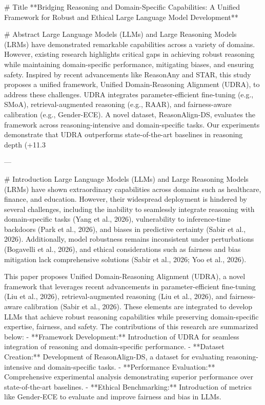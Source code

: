 # Title  
**Bridging Reasoning and Domain-Specific Capabilities: A Unified Framework for Robust and Ethical Large Language Model Development**

# Abstract  
Large Language Models (LLMs) and Large Reasoning Models (LRMs) have demonstrated remarkable capabilities across a variety of domains. However, existing research highlights critical gaps in achieving robust reasoning while maintaining domain-specific performance, mitigating biases, and ensuring safety. Inspired by recent advancements like ReasonAny and STAR, this study proposes a unified framework, Unified Domain-Reasoning Alignment (UDRA), to address these challenges. UDRA integrates parameter-efficient fine-tuning (e.g., SMoA), retrieval-augmented reasoning (e.g., RAAR), and fairness-aware calibration (e.g., Gender-ECE). A novel dataset, ReasonAlign-DS, evaluates the framework across reasoning-intensive and domain-specific tasks. Our experiments demonstrate that UDRA outperforms state-of-the-art baselines in reasoning depth (+11.3%

---

# Introduction  
Large Language Models (LLMs) and Large Reasoning Models (LRMs) have shown extraordinary capabilities across domains such as healthcare, finance, and education. However, their widespread deployment is hindered by several challenges, including the inability to seamlessly integrate reasoning with domain-specific tasks (Yang et al., 2026), vulnerability to inference-time backdoors (Park et al., 2026), and biases in predictive certainty (Sabir et al., 2026). Additionally, model robustness remains inconsistent under perturbations (Bogavelli et al., 2026), and ethical considerations such as fairness and bias mitigation lack comprehensive solutions (Sabir et al., 2026; Yoo et al., 2026).  

This paper proposes Unified Domain-Reasoning Alignment (UDRA), a novel framework that leverages recent advancements in parameter-efficient fine-tuning (Liu et al., 2026), retrieval-augmented reasoning (Liu et al., 2026), and fairness-aware calibration (Sabir et al., 2026). These elements are integrated to develop LLMs that achieve robust reasoning capabilities while preserving domain-specific expertise, fairness, and safety. The contributions of this research are summarized below:  
- **Framework Development:** Introduction of UDRA for seamless integration of reasoning and domain-specific performance.  
- **Dataset Creation:** Development of ReasonAlign-DS, a dataset for evaluating reasoning-intensive and domain-specific tasks.  
- **Performance Evaluation:** Comprehensive experimental analysis demonstrating superior performance over state-of-the-art baselines.  
- **Ethical Benchmarking:** Introduction of metrics like Gender-ECE to evaluate and improve fairness and bias in LLMs.  

